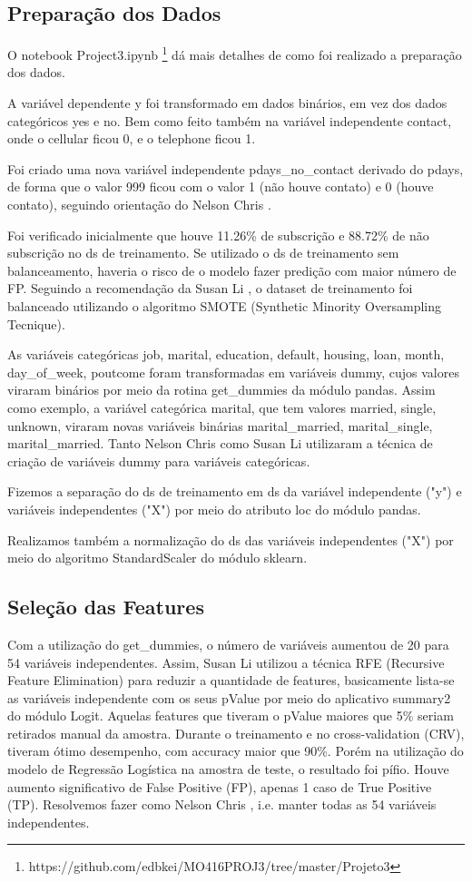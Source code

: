 \documentclass[twoside,conference,a4paper]{IEEEtran}
\begin{document}
\subsection{Preparação dos Dados}
O notebook Project3.ipynb \footnote{https://github.com/edbkei/MO416PROJ3/tree/master/Projeto3} dá mais detalhes de como foi realizado a preparação dos dados. 

A variável dependente y foi transformado em dados binários, em vez dos dados categóricos yes e no. Bem como feito também na variável independente contact, onde o cellular ficou 0, e o telephone ficou 1.

Foi criado uma nova variável independente pdays\_no\_contact derivado do pdays, de forma que o valor 999 ficou com o valor 1 (não houve contato) e 0 (houve contato), seguindo orientação do Nelson Chris \cite{Medium:2019}. 

Foi verificado inicialmente que houve 11.26\% de subscrição e 88.72\% de não subscrição no ds de treinamento. Se utilizado o ds de treinamento sem balanceamento, haveria o risco de o modelo fazer predição com maior número de FP. Seguindo a recomendação da Susan Li \cite{TowardsDataScience:2017} , o dataset de treinamento foi balanceado utilizando o algoritmo SMOTE (Synthetic Minority Oversampling Tecnique).

As variáveis categóricas job, marital, education, default, housing, loan, month, day\_of\_week, poutcome foram transformadas em variáveis dummy, cujos valores viraram binários por meio da rotina get\_dummies da módulo pandas. Assim como exemplo, a variável categórica marital, que tem valores married, single, unknown, viraram novas variáveis binárias marital\_married, marital\_single, marital\_married. Tanto Nelson Chris como Susan Li utilizaram a técnica de criação de variáveis dummy para variáveis categóricas.

Fizemos a separação do ds de treinamento em ds da variável independente ("y") e variáveis independentes ("X") por meio do atributo loc do módulo pandas.

Realizamos também a normalização do ds das variáveis independentes ("X") por meio do algoritmo StandardScaler do módulo sklearn.

\subsection{Seleção das Features}

Com a utilização do get\_dummies, o número de variáveis aumentou de 20 para 54 variáveis independentes. Assim, Susan Li \cite{TowardsDataScience:2017} utilizou a técnica RFE (Recursive Feature Elimination) para reduzir a quantidade de features, basicamente lista-se as variáveis independente com os seus pValue por meio do aplicativo summary2 do módulo Logit. Aquelas features que tiveram o pValue maiores que 5\% seriam retirados manual da amostra. Durante o treinamento e no cross-validation (CRV), tiveram ótimo desempenho, com accuracy maior que 90\%. Porém na utilização do modelo de Regressão Logística na amostra de teste, o resultado foi pífio. Houve aumento significativo de False Positive (FP), apenas 1 caso de True Positive (TP). Resolvemos fazer como Nelson Chris \cite{Medium:2019}, i.e. manter todas as 54 variáveis independentes.
\end{document}
